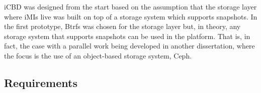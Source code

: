 iCBD was designed from the start based on the assumption that the storage layer where iMIs live was built on top of a storage system which supports snapshots. In the first prototype, Btrfs was chosen for the storage layer but, in theory, any storage system that supports snapshots can be used in the platform. That is, in fact, the case with a parallel work being developed in another dissertation, where the focus is the use of an object-based storage system, Ceph.


\subsection{Requirements}
\label{sub:impl_requirements_icbdrep}


 


